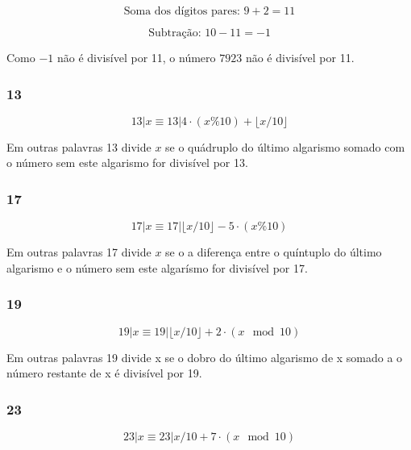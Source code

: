 \[
\text{Soma dos dígitos pares: } 9 + 2 = 11
\]

\[
\text{Subtração: } 10 - 11 = -1
\]

Como \(-1\) não é divisível por 11, o número \(7923\) não é divisível por 11.

\subsubsection{13}

\begin{equation}
    13 | x \equiv 13 | 4 \cdot (x\%10) + \lfloor x/10 \rfloor
\end{equation}

Em outras palavras 13 divide $x$ se o quádruplo do último algarismo somado com o número sem este algarismo for divisível por 13.

\subsubsection{17}

\begin{equation}
    17 | x \equiv 17 |  \lfloor x/10 \rfloor - 5 \cdot (x \% 10)
\end{equation}

Em outras palavras 17 divide $x$ se o a diferença entre o quíntuplo do último algarismo e o número sem este algarísmo for divisível por 17.

\subsubsection{19}

\begin{equation}
    19 | x \equiv 19 | \lfloor x / 10 \rfloor + 2 \cdot (x \mod 10)
\end{equation}

Em outras palavras 19 divide x se o dobro do último algarismo de x somado a o número restante de x é divisível por 19.

\subsubsection{23}

\begin{equation}
    23 | x \equiv 23 |  x / 10  + 7 \cdot (x \mod 10)  
\end{equation}


